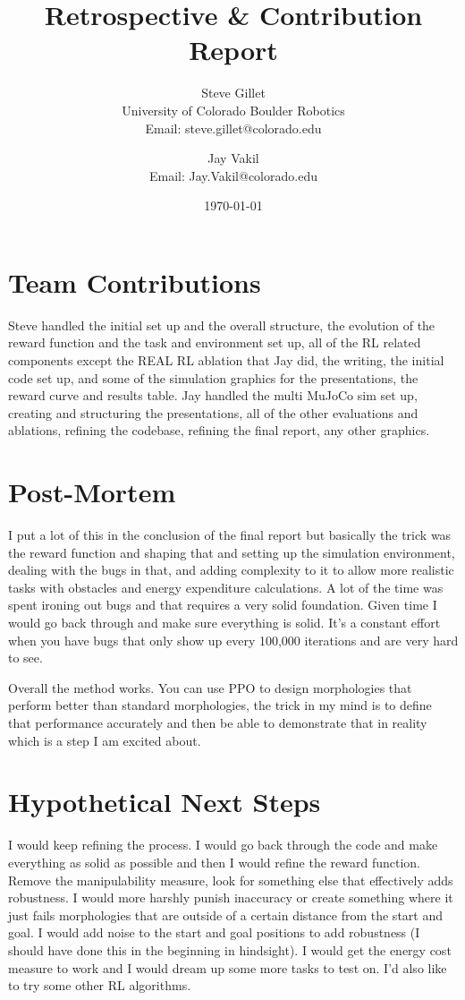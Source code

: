 \documentclass[11pt]{article}
\title{Retrospective \& Contribution Report}
\author{
Steve Gillet \\
University of Colorado Boulder Robotics \\
Email: steve.gillet@colorado.edu \\
\and
Jay Vakil \\
Email: Jay.Vakil@colorado.edu
}
\date{\today}
\begin{document}
\maketitle

\section{Team Contributions}
Steve handled the initial set up and the overall structure, the evolution of the reward function and the task and environment set up, all of the RL related components except the REAL RL ablation that Jay did, the writing, the initial code set up, and some of the simulation graphics for the presentations, the reward curve and results table.
Jay handled the multi MuJoCo sim set up, creating and structuring the presentations, all of the other evaluations and ablations, refining the codebase, refining the final report, any other graphics.

\section{Post-Mortem}
I put a lot of this in the conclusion of the final report but basically the trick was the reward function and shaping that and setting up the simulation environment, dealing with the bugs in that, and adding complexity to it to allow more realistic tasks with obstacles and energy expenditure calculations.
A lot of the time was spent ironing out bugs and that requires a very solid foundation.
Given time I would go back through and make sure everything is solid.
It's a constant effort when you have bugs that only show up every 100,000 iterations and are very hard to see.

Overall the method works.
You can use PPO to design morphologies that perform better than standard morphologies, the trick in my mind is to define that performance accurately and then be able to demonstrate that in reality which is a step I am excited about.

\section{Hypothetical Next Steps}
I would keep refining the process.
I would go back through the code and make everything as solid as possible and then I would refine the reward function.
Remove the manipulability measure, look for something else that effectively adds robustness.
I would more harshly punish inaccuracy or create something where it just fails morphologies that are outside of a certain distance from the start and goal.
I would add noise to the start and goal positions to add robustness (I should have done this in the beginning in hindsight).
I would get the energy cost measure to work and I would dream up some more tasks to test on.
I'd also like to try some other RL algorithms.
\end{document}

